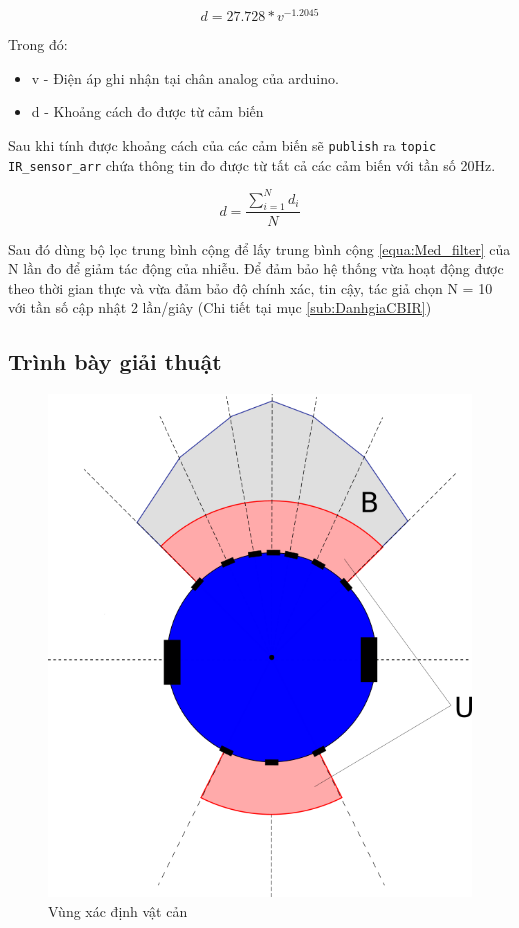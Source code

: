 \begin{equation}
    d = 27.728 * {v}^{-1.2045}
    \label{equa:Vol2Distance}
\end{equation}

Trong đó:
\begin{itemize}
    \item v - Điện áp ghi nhận tại chân analog của arduino.
    \item d - Khoảng cách đo được từ cảm biến
\end{itemize}

Sau khi tính được khoảng cách của các cảm biến sẽ {\tt publish} ra {\tt topic IR\_sensor\_arr} chứa thông tin đo được từ tất cả các cảm biến với tần số 20Hz.

\begin{equation}
    d = \frac{\sum_{i=1}^{N} d_i}{N}
    \label{equa:Med_filter}
\end{equation}

Sau đó dùng bộ lọc trung bình cộng để lấy trung bình cộng \ref{equa:Med_filter} của N lần đo để giảm tác động của nhiễu. Để đảm bảo hệ thống vừa hoạt động được theo thời gian thực và vừa đảm bảo độ chính xác, tin cậy, tác giả chọn N = 10 với tần số cập nhật 2 lần/giây (Chi tiết tại mục \ref{sub:DanhgiaCBIR})

\subsection{Trình bày giải thuật} \label{sub:IR-algorithm}

\begin{figure}[htbp]
    \centering
    \includegraphics[width=0.5\linewidth]{figures/arg_obstacle-detection-area.png}
    \caption{Vùng xác định vật cản}
    \label{fig:arg-obstacle-area}
\end{figure}

